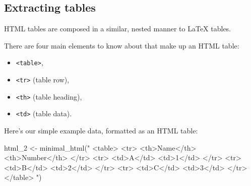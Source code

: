 \documentclass[
  12pt,
]{book}
\newenvironment{Shaded}{\begin{snugshade}}{\end{snugshade}}
\newcommand{\FunctionTok}[1]{\textcolor[rgb]{0.00,0.00,0.00}{#1}}
\newcommand{\NormalTok}[1]{#1}
\newcommand{\OtherTok}[1]{\textcolor[rgb]{0.56,0.35,0.01}{#1}}
\newcommand{\StringTok}[1]{\textcolor[rgb]{0.31,0.60,0.02}{#1}}
\providecommand{\tightlist}{%
  \setlength{\itemsep}{0pt}\setlength{\parskip}{0pt}}
\begin{document}
\hypertarget{extracting-tables}{%
\subsection{Extracting tables}\label{extracting-tables}}

HTML tables are composed in a similar, nested manner to LaTeX tables.

There are four main elements to know about that make up an HTML table:

\begin{itemize}
\tightlist
\item
  \texttt{\textless{}table\textgreater{}},
\item
  \texttt{\textless{}tr\textgreater{}} (table row),
\item
  \texttt{\textless{}th\textgreater{}} (table heading),
\item
  \texttt{\textless{}td\textgreater{}} (table data).
\end{itemize}

Here's our simple example data, formatted as an HTML table:

\begin{Shaded}
\begin{Highlighting}[]
\NormalTok{html\_2 }\OtherTok{\textless{}{-}} \FunctionTok{minimal\_html}\NormalTok{(}\StringTok{"}
\StringTok{  \textless{}table\textgreater{}}
\StringTok{    \textless{}tr\textgreater{}}
\StringTok{      \textless{}th\textgreater{}Name\textless{}/th\textgreater{}}
\StringTok{      \textless{}th\textgreater{}Number\textless{}/th\textgreater{}}
\StringTok{    \textless{}/tr\textgreater{}}
\StringTok{    \textless{}tr\textgreater{}}
\StringTok{      \textless{}td\textgreater{}A\textless{}/td\textgreater{}}
\StringTok{      \textless{}td\textgreater{}1\textless{}/td\textgreater{}}
\StringTok{    \textless{}/tr\textgreater{}}
\StringTok{    \textless{}tr\textgreater{}}
\StringTok{      \textless{}td\textgreater{}B\textless{}/td\textgreater{}}
\StringTok{      \textless{}td\textgreater{}2\textless{}/td\textgreater{}}
\StringTok{    \textless{}/tr\textgreater{}}
\StringTok{    \textless{}tr\textgreater{}}
\StringTok{      \textless{}td\textgreater{}C\textless{}/td\textgreater{}}
\StringTok{      \textless{}td\textgreater{}3\textless{}/td\textgreater{}}
\StringTok{    \textless{}/tr\textgreater{}}
\StringTok{  \textless{}/table\textgreater{}}
\StringTok{  "}\NormalTok{)}
\end{Highlighting}
\end{Shaded}
\end{document}
